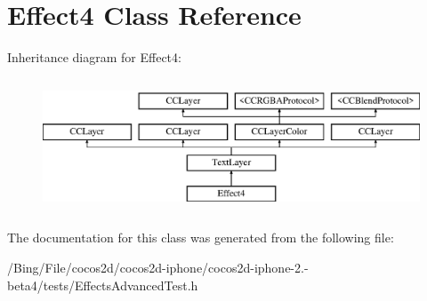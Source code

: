 \hypertarget{interface_effect4}{\section{Effect4 Class Reference}
\label{interface_effect4}
}
Inheritance diagram for Effect4\-:\begin{figure}[H]
\begin{center}
\leavevmode
\includegraphics[height=4.000000cm]{interface_effect4}
\end{center}
\end{figure}


The documentation for this class was generated from the following file\-:\begin{DoxyCompactItemize}
\item 
/\-Bing/\-File/cocos2d/cocos2d-\/iphone/cocos2d-\/iphone-\/2.-\/beta4/tests/Effects\-Advanced\-Test.\-h\end{DoxyCompactItemize}
